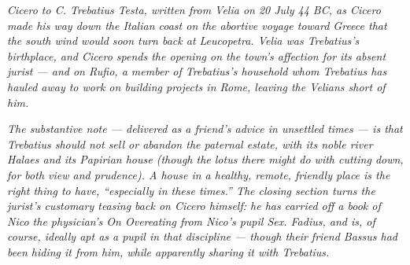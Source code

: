
\textit{Cicero to C. Trebatius Testa, written from Velia on 20 July
44 BC, as Cicero made his way down the Italian coast on the abortive
voyage toward Greece that the south wind would soon turn back at
Leucopetra. Velia was Trebatius's birthplace, and Cicero spends the
opening on the town's affection for its absent jurist --- and on
Rufio, a member of Trebatius's household whom Trebatius has hauled
away to work on building projects in Rome, leaving the Velians
short of him.}

\textit{The substantive note --- delivered as a friend's advice in
unsettled times --- is that Trebatius should not sell or abandon the
paternal estate, with its noble river Halaes and its Papirian house
(though the lotus there might do with cutting down, for both view
and prudence). A house in a healthy, remote, friendly place is the
right thing to have, ``especially in these times.'' The closing
section turns the jurist's customary teasing back on Cicero himself:
he has carried off a book of Nico the physician's \textit{On
Overeating} from Nico's pupil Sex. Fadius, and is, of course,
ideally apt as a pupil in that discipline --- though their friend
Bassus had been hiding it from him, while apparently sharing it
with Trebatius.}
